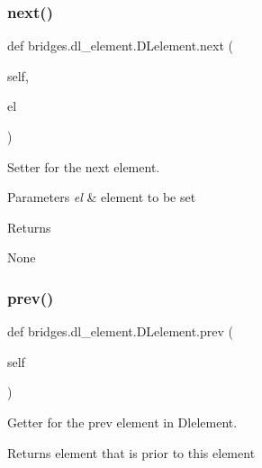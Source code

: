 \subsubsection{\texorpdfstring{next()}{next()}\hspace{0.1cm}{\footnotesize\ttfamily [2/2]}}
{\footnotesize\ttfamily def bridges.\+dl\+\_\+element.\+D\+Lelement.\+next (\begin{DoxyParamCaption}\item[{}]{self,  }\item[{}]{el }\end{DoxyParamCaption})}



Setter for the next element. 


\begin{DoxyParams}{Parameters}
{\em el} & element to be set \\
\hline
\end{DoxyParams}
\begin{DoxyReturn}{Returns}


None 
\end{DoxyReturn}
\mbox{\label{classbridges_1_1dl__element_1_1_d_lelement_a66e7c4bfb2216a68744fe58c24e9917f}} 
\subsubsection{\texorpdfstring{prev()}{prev()}\hspace{0.1cm}{\footnotesize\ttfamily [1/2]}}
{\footnotesize\ttfamily def bridges.\+dl\+\_\+element.\+D\+Lelement.\+prev (\begin{DoxyParamCaption}\item[{}]{self }\end{DoxyParamCaption})}



Getter for the prev element in Dlelement. 

\begin{DoxyReturn}{Returns}
element that is prior to this element 
\end{DoxyReturn}
\mbox{\label{classbridges_1_1dl__element_1_1_d_lelement_a17c371ec0c38e9555e55551d9be4d185}} 
